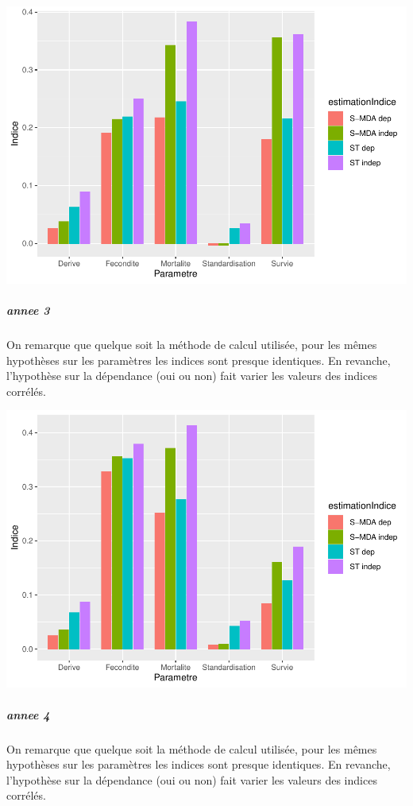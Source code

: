 \documentclass[
]{article}
\begin{document}
\includegraphics{rapport_files/figure-latex/prtzygs-1.pdf}

\hypertarget{annee-3}{%
\subparagraph{annee 3}\label{annee-3}}

On remarque que quelque soit la méthode de calcul utilisée, pour les
mêmes hypothèses sur les paramètres les indices sont presque identiques.
En revanche, l'hypothèse sur la dépendance (oui ou non) fait varier les
valeurs des indices corrélés.

\includegraphics{rapport_files/figure-latex/pzrtygs-1.pdf}

\hypertarget{annee-4}{%
\subparagraph{annee 4}\label{annee-4}}

On remarque que quelque soit la méthode de calcul utilisée, pour les
mêmes hypothèses sur les paramètres les indices sont presque identiques.
En revanche, l'hypothèse sur la dépendance (oui ou non) fait varier les
valeurs des indices corrélés.
\end{document}
